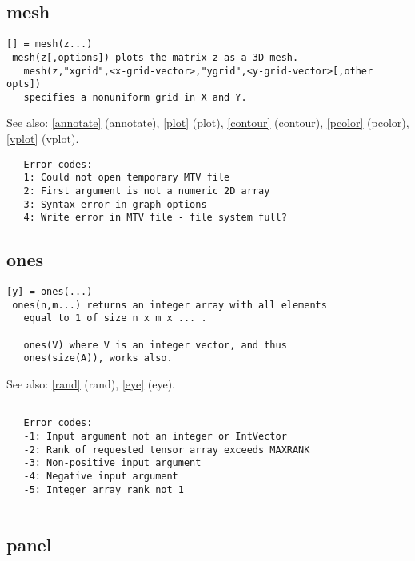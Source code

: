 \documentclass[a4paper]{article}
\begin{document}
\subsection{mesh\label{mesh}}

\begin{tscreen}
\begin{verbatim}
[] = mesh(z...)
 mesh(z[,options]) plots the matrix z as a 3D mesh.
   mesh(z,"xgrid",<x-grid-vector>,"ygrid",<y-grid-vector>[,other opts])
   specifies a nonuniform grid in X and Y.
\end{verbatim}

See also: \ref{annotate} {(annotate)}, \ref{plot} {(plot)}, \ref{contour} {(contour)}, \ref{pcolor} {(pcolor)}, \ref{vplot} {(vplot)}.
\begin{verbatim}
   Error codes:
   1: Could not open temporary MTV file
   2: First argument is not a numeric 2D array
   3: Syntax error in graph options
   4: Write error in MTV file - file system full? 
\end{verbatim}
\end{tscreen}





\subsection{ones\label{ones}}

\begin{tscreen}
\begin{verbatim}
[y] = ones(...)
 ones(n,m...) returns an integer array with all elements
   equal to 1 of size n x m x ... .

   ones(V) where V is an integer vector, and thus
   ones(size(A)), works also.
\end{verbatim}

See also: \ref{rand} {(rand)}, \ref{eye} {(eye)}.
\begin{verbatim}
   
   Error codes:
   -1: Input argument not an integer or IntVector
   -2: Rank of requested tensor array exceeds MAXRANK
   -3: Non-positive input argument
   -4: Negative input argument
   -5: Integer array rank not 1
   
\end{verbatim}
\end{tscreen}





\subsection{panel\label{panel}}
\end{document}
